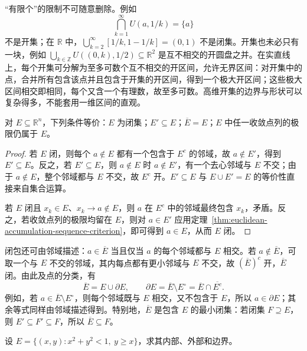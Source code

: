 \documentclass[UTF8,12pt,a4paper,fontset=fandol]{ctexbook}
\begin{document}
“有限个”的限制不可随意删除。例如
\[
    \bigcap_{k=1}^\infty U(a,1/k)=\{a\}
\]
不是开集；在 $\mathbb R$ 中，$\bigcup_{k=2}^\infty[1/k,1-1/k]=(0,1)$ 不是闭集。开集也未必只有一块，例如 $\bigcup_{k\in\mathbb Z}U((0,k),1/2)\subseteq\mathbb R^2$ 是互不相交的开圆盘之并。在实直线上，每个开集可分解为至多可数个互不相交的开区间，允许无界区间：对开集中的点，合并所有包含该点并且包含于开集的开区间，得到一个极大开区间；这些极大区间相交即相同，每个又含一个有理数，故至多可数。高维开集的边界与形状可以复杂得多，不能套用一维区间的直观。

\begin{theorem}[闭集的聚点与点列刻画]
\label{thm:euclidean-closed-set-criteria}
对 $E\subseteq\mathbb R^n$，下列条件等价：$E$ 为闭集；$E'\subseteq E$；$\overline E=E$；$E$ 中任一收敛点列的极限仍属于 $E$。
\end{theorem}

\begin{proof}
若 $E$ 闭，则每个 $a\notin E$ 都有一个包含于 $E^c$ 的邻域，故 $a\notin E'$，得到 $E'\subseteq E$。反之，若 $E'\subseteq E$，则 $a\notin E$ 时 $a\notin E'$，有一个去心邻域与 $E$ 不交；由于 $a\notin E$，整个邻域都与 $E$ 不交，故 $E^c$ 开。$E'\subseteq E$ 与 $E\cup E'=E$ 的等价性直接来自集合运算。

若 $E$ 闭且 $x_k\in E$、$x_k\to a\notin E$，则 $a$ 在 $E^c$ 中的邻域最终包含 $x_k$，矛盾。反之，若收敛点列的极限均留在 $E$，则对 $a\in E'$ 应用定理~\ref{thm:euclidean-accumulation-sequence-criterion}，即可得到 $a\in E$，从而 $E$ 闭。
\end{proof}

闭包还可由邻域描述：$a\in\overline E$ 当且仅当 $a$ 的每个邻域都与 $E$ 相交。若 $a\notin\overline E$，可取一个与 $E$ 不交的邻域，其内每点都有更小邻域与 $E$ 不交，故 $(\overline E)^c$ 开，$\overline E$ 闭。由此及点的分类，有
\begin{equation}
    \overline E=E\cup\partial E,
    \qquad \partial E=\overline E\setminus E^\circ
                      =\overline E\cap\overline{E^c}.
    \label{eq:euclidean-closure-boundary-identities}
\end{equation}
例如，若 $a\in\overline E\setminus E^\circ$，则每个邻域既与 $E$ 相交，又不包含于 $E$，所以 $a\in\partial E$；其余等式同样由邻域描述得到。特别地，$\overline E$ 是包含 $E$ 的最小闭集：若闭集 $F\supseteq E$，则 $E'\subseteq F'\subseteq F$，所以 $\overline E\subseteq F$。

\begin{example}
\label{ex:half-open-disk-interior-boundary}
设 $E=\{(x,y):x^2+y^2<1,\ y\geq x\}$，求其内部、外部和边界。
\end{example}
\end{document}
